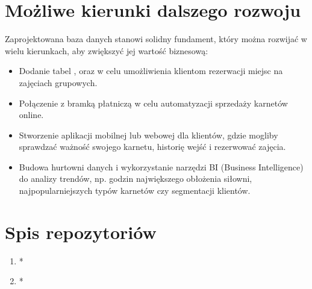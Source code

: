 \documentclass[letterpaper,10pt,polish]{sphinxmanual}
\begin{document}
\section{Możliwe kierunki dalszego rozwoju}
\label{\detokenize{rozdzial5/rozdzial5:mozliwe-kierunki-dalszego-rozwoju}}
\sphinxAtStartPar
Zaprojektowana baza danych stanowi solidny fundament, który można rozwijać w wielu kierunkach, aby zwiększyć jej wartość biznesową:
\begin{itemize}
\item {} 
\sphinxAtStartPar
{} Dodanie tabel ,  oraz  w celu umożliwienia klientom rezerwacji miejsc na zajęciach grupowych.

\item {} 
\sphinxAtStartPar
{} Połączenie z bramką płatniczą w celu automatyzacji sprzedaży karnetów online.

\item {} 
\sphinxAtStartPar
{} Stworzenie aplikacji mobilnej lub webowej dla klientów, gdzie mogliby sprawdzać ważność swojego karnetu, historię wejść i rezerwować zajęcia.

\item {} 
\sphinxAtStartPar
{} Budowa hurtowni danych i wykorzystanie narzędzi BI (Business Intelligence) do analizy trendów, np. godzin największego obłożenia siłowni, najpopularniejszych typów karnetów czy segmentacji klientów.

\end{itemize}


\section{Spis repozytoriów}
\label{\detokenize{rozdzial5/rozdzial5:spis-repozytoriow}}\begin{enumerate}
%
\item {} 
\sphinxAtStartPar
{}
* 

\item {} 
\sphinxAtStartPar
{}
* 

\end{enumerate}



\renewcommand{\indexname}{Indeks}
\printindex
\end{document}
